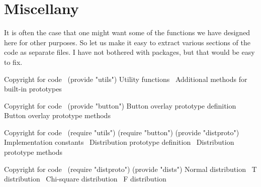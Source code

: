 \section{Miscellany}
\label{sec:misc}
It is often the case that one might want some of the functions we have
designed here for other purposes. So let us make it easy to extract
various sections of the code as separate files. I have not bothered
with packages, but that would be easy to fix.

\nwenddocs{}\endmoddef
\LA{}Copyright for code~{\nwtagstyle{}}\RA{}
(provide "utils")
\LA{}Utility functions~{\nwtagstyle{}}\RA{}
\LA{}Additional methods for built-in prototypes~{\nwtagstyle{}}\RA{}
\nwendcode{}\nwdocspar

\nwenddocs{}\endmoddef
\LA{}Copyright for code~{\nwtagstyle{}}\RA{}
(provide "button")
\LA{}Button overlay prototype definition~{\nwtagstyle{}}\RA{}
\LA{}Button overlay prototype methods~{\nwtagstyle{}}\RA{}
\nwendcode{}\nwdocspar

\nwenddocs{}\endmoddef
\LA{}Copyright for code~{\nwtagstyle{}}\RA{}
(require "utils")
(require "button")
(provide "distproto")
\LA{}Implementation constants~{\nwtagstyle{}}\RA{}
\LA{}Distribution prototype definition~{\nwtagstyle{}}\RA{}
\LA{}Distribution prototype methods~{\nwtagstyle{}}\RA{}
\nwendcode{}\nwdocspar

\nwenddocs{}\endmoddef
\LA{}Copyright for code~{\nwtagstyle{}}\RA{}
(require "distproto")
(provide "dists")
\LA{}Normal distribution~{\nwtagstyle{}}\RA{}
\LA{}T distribution~{\nwtagstyle{}}\RA{}
\LA{}Chi-square distribution~{\nwtagstyle{}}\RA{}
\LA{}F distribution~{\nwtagstyle{}}\RA{}
\nwendcode{}\nwdocspar


